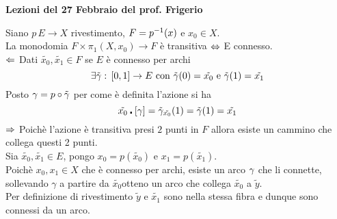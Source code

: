  

\textbf{Lezioni del 27  Febbraio del prof. Frigerio}
\begin{oss}Siano $p\, E \to X$ rivestimento, $F=p^{-1}(x)$ e $x_0 \in X$.\\
La monodomia $F \times \pi_1(X,x_0) \to F$ \`e transitiva $\Leftrightarrow$ E connesso.\\
\proof $\Leftarrow$ Dati $\tilde{x_0},\tilde{x_1} \in F$ se $E$ \`e connesso per archi 
$$ \exists \tilde{\gamma} :\, [0,1]\to E\text{ con }\tilde{\gamma}(0)=\tilde{x_0}\text{ e } \tilde{\gamma}(1)=\tilde{x_1}$$
Posto $\gamma = p \circ \tilde{\gamma}$ per come \`e definita l'azione si ha
$$ \tilde{x_0}\centerdot [ \gamma ] = \tilde{\gamma}_{\tilde{x_0}} (1)=\tilde{\gamma} (1) =\tilde{x_1}$$
$\Rightarrow$ Poich\`e l'azione \`e transitiva presi $2$ punti in $F$  allora esiste un cammino che collega questi 2 punti.\\
Sia $\tilde{x_0}, \tilde{x_1}\in E$, pongo $x_0=p(\tilde{x_0})$ e $x_1=p(\tilde{x_1})$.\\
Poich\`e $x_0, x_1 \in X$ che \`e connesso per archi, esiste un arco 
$\gamma$ che li connette, sollevando $\gamma$  
a partire da $\tilde{x_0}$otteno un arco che collega $\tilde{x_0}$ a $\tilde{y}$.\\
Per definizione di rivestimento $\tilde{y}$ e $\tilde{x_1}$ sono nella stessa fibra e dunque sono connessi da un arco.\\
\end{oss}


